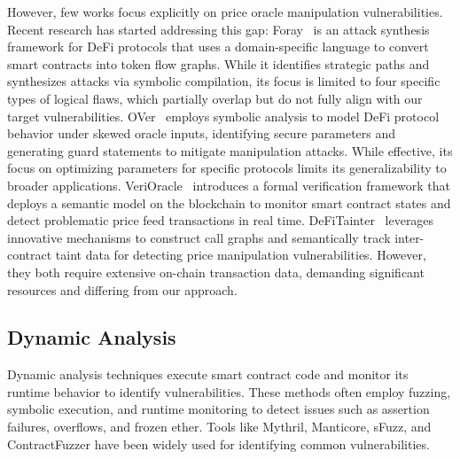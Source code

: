 However, few works focus explicitly on price oracle manipulation vulnerabilities. Recent research has started addressing this gap:
Foray~\cite{wen2024foray} is an attack synthesis framework for DeFi protocols that uses a domain-specific language to convert smart contracts into token flow graphs. While it identifies strategic paths and synthesizes attacks via symbolic compilation, its focus is limited to four specific types of logical flaws, which partially overlap but do not fully align with our target vulnerabilities.
OVer~\cite{deng2024safeguarding} employs symbolic analysis to model DeFi protocol behavior under skewed oracle inputs, identifying secure parameters and generating guard statements to mitigate manipulation attacks. While effective, its focus on optimizing parameters for specific protocols limits its generalizability to broader applications.
VeriOracle~\cite{mo2023toward} introduces a formal verification framework that deploys a semantic model on the blockchain to monitor smart contract states and detect problematic price feed transactions in real time.
DeFiTainter~\cite{kong2023defitainter} leverages innovative mechanisms to construct call graphs and semantically track inter-contract taint data for detecting price manipulation vulnerabilities. 
However, they both require extensive on-chain transaction data, demanding significant resources and differing from our approach.


\subsection{Dynamic Analysis} \label{Dynamic Analysis}
Dynamic analysis techniques execute smart contract code and monitor its runtime behavior to identify vulnerabilities. These methods often employ fuzzing, symbolic execution, and runtime monitoring to detect issues such as assertion failures, overflows, and frozen ether. Tools like Mythril\cite{mueller2024mythril}, Manticore\cite{mossberg2019manticore}, sFuzz\cite{nguyen2020sfuzz}, and ContractFuzzer\cite{jiang2018contractfuzzer} have been widely used for identifying common vulnerabilities.

